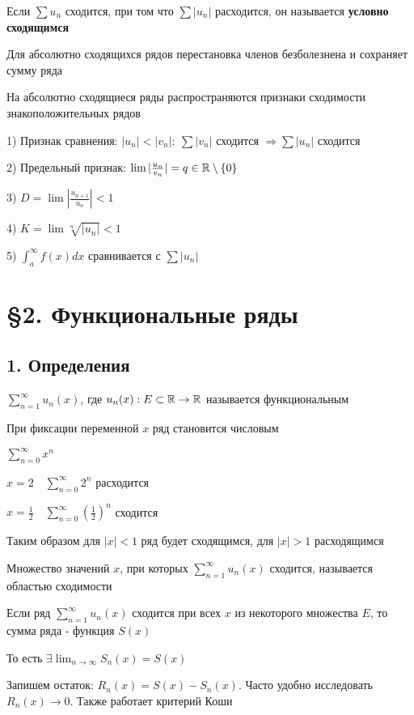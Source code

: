 \documentclass[12pt]{article}
\begin{document}
    \Defs Если $\sum u_n$ сходится, при том что $\sum |u_n|$ расходится, он называется \textbf{условно сходящимся}

    \Notas Для абсолютно сходящихся рядов перестановка членов безболезнена и сохраняет сумму ряда

    \Notas На абсолютно сходящиеся ряды распространяются признаки сходимости знакоположительных рядов

    1) Признак сравнения: $|u_n| < |v_n|: \ \sum |v_n|$ сходится $\Longrightarrow \sum |u_n|$ сходится

    2) Предельный признак: $\lim |\frac{u_n}{v_n}| = q \in \mathbb{R} \setminus \{0\}$

    3) $D = \lim |\frac{u_{n + 1}}{u_n}| < 1$

    4) $K = \lim \sqrt[n]{|{u_n}|} < 1$

    5) $\int_a^\infty f(x)dx$ сравнивается с $\sum |u_n|$

    \clearpage


    \section{\S 2. Функциональные ряды}

    \subsection{1. Определения}

    \Def $\sum_{n = 1}^\infty u_n(x)$, где $u_n(x) : E \subset \mathbb{R} \to \mathbb{R}$ называется функциональным

    \Notas При фиксации переменной $x$ ряд становится числовым

    \Exs $\sum_{n = 0}^\infty x^n$

    $x = 2 \quad \sum_{n = 0}^\infty 2^n$ расходится

    $x = \frac{1}{2} \quad \sum_{n = 0}^\infty (\frac{1}{2})^n$ сходится

    Таким образом для $|x| < 1$ ряд будет сходящимся, для $|x| > 1$ расходящимся

    \Def Множество значений $x$, при которых $\sum_{n = 1}^\infty u_n(x)$ сходится, называется областью сходимости

    \Defs Если ряд $\sum_{n = 1}^\infty u_n(x)$ сходится при всех $x$ из некоторого множества $E$, то сумма ряда -
    функция $S(x)$

    \Nota То есть $\exists \lim_{n \to \infty} S_n(x) = S(x)$

    Запишем остаток: $R_n(x) = S(x) - S_n(x)$. Часто удобно исследовать $R_n(x) \to 0$. Также работает критерий Коши
\end{document}
